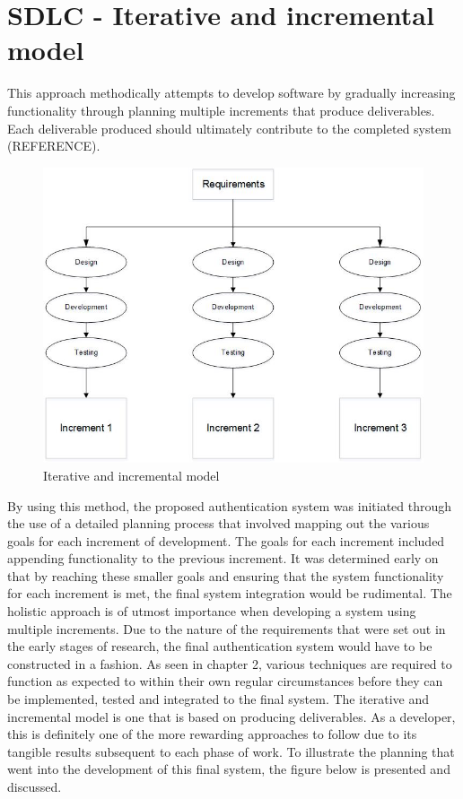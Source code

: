 \section{SDLC - Iterative and incremental model}

This approach methodically attempts to develop software by gradually increasing functionality through planning multiple increments that produce deliverables. Each deliverable produced should ultimately contribute to the completed system (REFERENCE). 


    
    \begin{figure}[htbp!] 
    \centering    
    \includegraphics[width=1.0\textwidth]{Chapter3/Figs/Iterative_and_Incremental_Model.jpg}
    \caption[Iterative and incremental model]{Iterative and incremental model}
    \label{fig:Iterative and incremental model}
    \end{figure}
    
By using this method, the proposed authentication system was initiated through the use of a detailed planning process that involved mapping out the various goals for each increment of development. The goals for each increment included appending functionality to the previous increment. It was determined early on that by reaching these smaller goals and ensuring that the system functionality for each increment is met, the final system integration would be rudimental. The holistic approach is of utmost importance when developing a system using multiple increments. Due to the nature of the requirements that were set out in the early stages of research, the final authentication system would have to be constructed in a fashion. As seen in chapter 2, various techniques are required to function as expected to within their own regular circumstances before they can be implemented, tested and integrated to the final system. 
The iterative and incremental model is one that is based on producing deliverables. As a developer, this is definitely one of the more rewarding approaches to follow due to its tangible results subsequent to each phase of work. To illustrate the planning that went into the development of this final system, the figure below is presented and discussed. 

